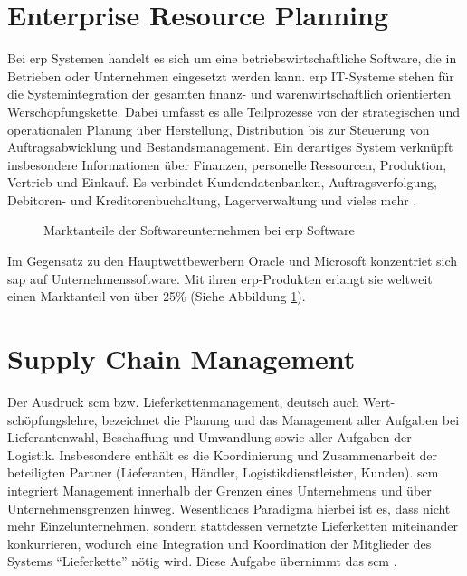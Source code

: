 \section{Enterprise Resource Planning}
\label{sec:erp-definition}
Bei \gls{erp} Systemen handelt es sich um eine betriebswirtschaftliche Software, die in Betrieben oder Unternehmen eingesetzt werden kann. \gls{erp} IT-Systeme stehen für die Systemintegration der gesamten finanz- und warenwirtschaftlich orientierten Werschöpfungskette. Dabei umfasst es alle Teilprozesse von der strategischen und operationalen Planung über Herstellung, Distribution bis zur Steuerung von Auftragsabwicklung und Bestandsmanagement. Ein derartiges System verknüpft insbesondere Informationen über Finanzen, personelle Ressourcen, Produktion, Vertrieb und Einkauf. Es verbindet Kundendatenbanken, Auftragsverfolgung, Debitoren- und Kreditorenbuchaltung, Lagerverwaltung und vieles mehr \cite{ERPDefinition}.

\begin{figure}[H]
  \centering 
  \caption{Marktanteile der Softwareunternehmen bei \gls{erp} Software} 
  \label{abb:SAPMarktanteil} 
\end{figure} 

Im Gegensatz zu den Hauptwettbewerbern Oracle und Microsoft konzentriet sich \gls{sap} auf Unternehmenssoftware. Mit ihren \gls{erp}-Produkten erlangt sie weltweit einen Marktanteil von über 25\% (Siehe Abbildung \ref{abb:SAPMarktanteil}).

\section{Supply Chain Management}
\label{sec:scm-definition}
Der Ausdruck \gls{scm} bzw. Lieferkettenmanagement, deutsch auch Wert-schöpfungslehre, bezeichnet die Planung und das Management aller Aufgaben bei Lieferantenwahl, Beschaffung und Umwandlung sowie aller Aufgaben der Logistik. Insbesondere enthält es die Koordinierung und Zusammenarbeit der beteiligten Partner (Lieferanten, Händler, Logistikdienstleister, Kunden). \gls{scm} integriert Management innerhalb der Grenzen eines Unternehmens und über Unternehmensgrenzen hinweg. Wesentliches Paradigma hierbei ist es, dass nicht mehr Einzelunternehmen, sondern stattdessen vernetzte Lieferketten miteinander konkurrieren, wodurch eine Integration und Koordination der Mitglieder des Systems "`Lieferkette"' nötig wird. Diese Aufgabe übernimmt das \gls{scm} \cite{SCMDefinition}.

